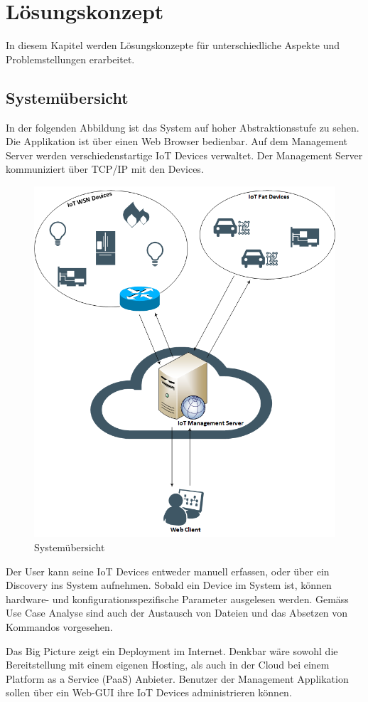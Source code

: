 \chapter{Lösungskonzept}
In diesem Kapitel werden Lösungskonzepte für unterschiedliche Aspekte und Problemstellungen erarbeitet. 

\section{Systemübersicht}
In der folgenden Abbildung ist das System auf hoher Abstraktionsstufe zu sehen. Die Applikation ist über einen Web Browser bedienbar. Auf dem Management Server werden verschiedenstartige IoT Devices verwaltet. Der Management Server kommuniziert über TCP/IP mit den Devices. 
\begin{figure}[H]
\centering
\includegraphics[scale=0.5]{images/systemuebersicht.png}
\caption{Systemübersicht}
\end{figure}
Der User kann seine IoT Devices entweder manuell erfassen, oder über ein Discovery ins System aufnehmen. Sobald ein Device im System ist, können hardware- und konfigurationsspezifische Parameter ausgelesen werden. Gemäss Use Case Analyse sind auch der Austausch von Dateien und das Absetzen von Kommandos vorgesehen.

Das Big Picture zeigt ein Deployment im Internet. Denkbar wäre sowohl die Bereitstellung mit einem eigenen Hosting, als auch in der Cloud bei einem Platform as a Service (PaaS) Anbieter. Benutzer der Management Applikation sollen über ein Web-GUI ihre IoT Devices administrieren können.

\section{}